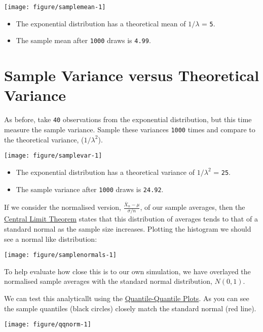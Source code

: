 \documentclass[legalpaper]{article}
\begin{document}
\begin{center}\texttt{[image: figure/samplemean-1]} \end{center}

\begin{itemize}
\itemsep1pt\parskip0pt
\item
  The exponential distribution has a theoretical mean of \(1/\lambda\) =
  \texttt{5}.
\item
  The sample mean after \texttt{1000} draws is \texttt{4.99}.
\end{itemize}

\section{Sample Variance versus Theoretical
Variance}\label{sample-variance-versus-theoretical-variance}

As before, take \texttt{40} observations from the exponential
distribution, but this time measure the sample variance. Sample these
variances \texttt{1000} times and compare to the theoretical variance,
(\(1/\lambda^2\)).

\begin{center}\texttt{[image: figure/samplevar-1]} \end{center}

\begin{itemize}
\itemsep1pt\parskip0pt
\item
  The exponential distribution has a theoretical variance of
  \(1/\lambda^2\) = \texttt{25}.
\item
  The sample variance after \texttt{1000} draws is \texttt{24.92}.
\end{itemize}


If we consider the normalised version,
\(\frac {\bar X_n - \mu} {\sigma / n}\), of our sample averages, then
the \href{https://en.wikipedia.org/wiki/Central_limit_theorem}{Central
Limit Theorem} states that this distribution of averages tends to that
of a standard normal as the sample size increases. Plotting the
histogram we should see a normal like distribution:

\begin{center}\texttt{[image: figure/samplenormals-1]} \end{center}

To help evaluate how close this is to our own simulation, we have
overlayed the normalised sample averages with the standard normal
distribution, \(N(0,1)\).

We can test this analyticallt using the
\href{https://stat.ethz.ch/R-manual/R-devel/library/stats/html/qqnorm.html}{Quantile-Quantile
Plots}. As you can see the sample quantiles (black circles) closely
match the standard normal (red line).

\begin{center}\texttt{[image: figure/qqnorm-1]} \end{center}
\end{document}
